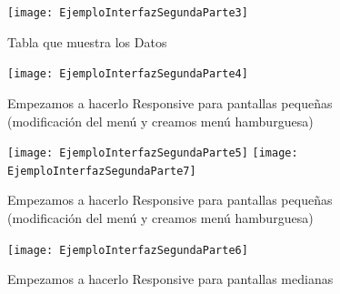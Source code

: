 \documentclass[12pt, fleqn]{report}                             %
\begin{document}
        \begin{figure}[ht]
            \centering
            \texttt{[image: EjemploInterfazSegundaParte3]}
            \caption{Tabla que muestra los Datos}
        \end{figure}

        \begin{figure}[ht]
            \centering
            \texttt{[image: EjemploInterfazSegundaParte4]}
            \caption{Empezamos a hacerlo Responsive para pantallas pequeñas (modificación del menú y creamos menú hamburguesa)}
        \end{figure}

        \begin{figure}[ht]
            \centering
            \texttt{[image: EjemploInterfazSegundaParte5]}
            \texttt{[image: EjemploInterfazSegundaParte7]}
            \caption{Empezamos a hacerlo Responsive para pantallas pequeñas (modificación del menú y creamos menú hamburguesa)}
        \end{figure}


        \begin{figure}[ht]
            \centering
            \texttt{[image: EjemploInterfazSegundaParte6]}
            \caption{Empezamos a hacerlo Responsive para pantallas medianas}
        \end{figure}



    
\end{document}
